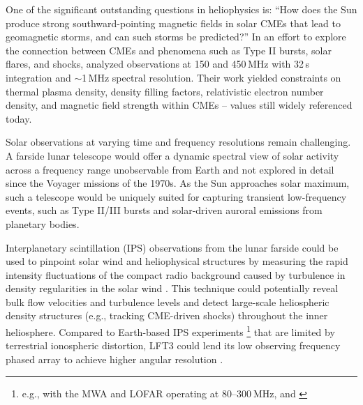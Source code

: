 One of the significant outstanding questions in heliophysics is: ``How does the Sun produce strong southward-pointing magnetic fields in solar CMEs that lead to geomagnetic storms, and can such storms be predicted?'' In an effort to explore the connection between CMEs and phenomena such as Type II bursts, solar flares, and shocks, \citet{Bastian_2001} analyzed observations at 150 and 450\,MHz with 32\,s integration and $\sim$1\,MHz spectral resolution. Their work yielded constraints on thermal plasma density, density filling factors, relativistic electron number density, and magnetic field strength within CMEs -- values still widely referenced today.

Solar observations at varying time and frequency resolutions remain challenging. A farside lunar telescope would offer a dynamic spectral view of solar activity across a frequency range unobservable from Earth and not explored in detail since the Voyager missions of the 1970s. As the Sun approaches solar maximum, such a telescope would be uniquely suited for capturing transient low-frequency events, such as Type II/III bursts and solar-driven auroral emissions from planetary bodies. 

Interplanetary scintillation (IPS) observations from the lunar farside could be used to pinpoint solar wind and heliophysical structures by measuring the rapid intensity fluctuations of the compact radio background caused by turbulence in density regularities in the solar wind \citep{fallows_application_2023}. This technique could potentially reveal bulk flow velocities and turbulence levels and detect large-scale heliospheric density structures (e.g., tracking CME-driven shocks) throughout the inner heliosphere. Compared to Earth-based IPS experiments \footnote{e.g., with the MWA and LOFAR operating at $80$–$300~\text{MHz}$, \cite{fallows_separating_2016} and \cite{kaplan_murchison_2015}} that are limited by terrestrial ionospheric distortion, LFT3 could lend its low observing frequency phased array to achieve higher angular resolution \citep{DEX}. 


